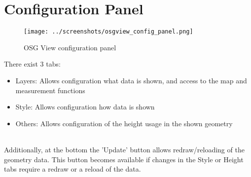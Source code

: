 \section{Configuration Panel}
\label{sec:osgview_config_panel}

\begin{figure}[H]
    \texttt{[image: ../screenshots/osgview\_config\_panel.png]}
  \caption{OSG View configuration panel}
\end{figure}

There exist 3 tabs:
\begin{itemize}
 \item Layers: Allows configuration what data is shown, and access to the map and measurement functions
 \item Style: Allows configuration how data is shown
 \item Others: Allows configuration of the height usage in the shown geometry
\end{itemize}
\ \\

Additionally, at the bottom the 'Update' button allows redraw/reloading of the geometry data. This button becomes available if changes in the Style or Height tabs require a redraw or a reload of the data. \\


 
 

